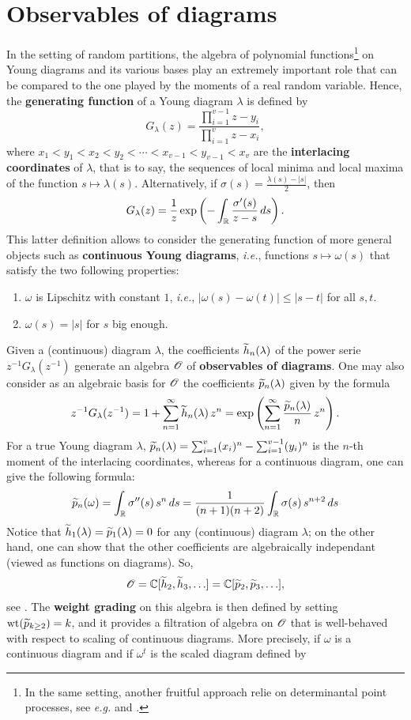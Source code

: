 \documentclass[10pt]{amsart}
\begin{document}
\section{Observables of diagrams}\label{obs}
In the setting of random partitions, the algebra of polynomial functions\footnote{In the same setting, another fruitful approach relie on determinantal point processes, see \emph{e.g.} \cite{BO00} and \cite{BO05}.} on Young diagrams and its various bases play an extremely important role that can be compared to the one played by the moments of a real random variable. Hence, the \textbf{generating function} of a Young diagram $\lambda$ is defined by
$$G_{\lambda}(z)=\frac{\prod_{i=1}^{v-1}z-y_{i}}{\prod_{i=1}^{v}z-x_{i}},$$
where $x_{1}<y_{1}<x_{2}<y_{2}<\cdots<x_{v-1}<y_{v-1}<x_{v}$ are the \textbf{interlacing coordinates} of $\lambda$, that is to say, the sequences of local minima and local maxima of the function $s\mapsto \lambda(s)$. Alternatively, if $\sigma(s)=\frac{\lambda(s)-|s|}{2}$, then 
$$G_{\lambda}(z)=\frac{1}{z}\exp\left(-\int_{\mathbb{R}}\frac{\sigma'(s)}{z-s}\,ds\right).$$
This latter definition allows to consider the generating function of more general objects such as \textbf{continuous Young diagrams}, \emph{i.e.}, functions $s\mapsto \omega(s)$ that satisfy the two following properties:
\begin{enumerate}
\item $\omega$ is Lipschitz with constant $1$, \emph{i.e.}, $|\omega(s)-\omega(t)|\leq |s-t|$ for all $s,t$.
\item $\omega(s)=|s|$ for $s$ big enough.
\end{enumerate}
Given a (continuous) diagram $\lambda$, the coefficients $\widetilde{h}_{n}(\lambda)$ of the power serie $z^{-1}G_{\lambda}(z^{-1})$ generate an algebra $\mathscr{O}$ of \textbf{observables of diagrams}. One may also consider as an algebraic basis for $\mathscr{O}$ the coefficients $\widetilde{p}_{n}(\lambda)$ given by the formula
$$z^{-1}G_{\lambda}(z^{-1})=1+\sum_{n=1}^{\infty} \widetilde{h}_{n}(\lambda)\,z^n=\exp\left(\sum_{n=1}^{\infty} \frac{\widetilde{p}_{n}(\lambda)}{n}\,z^{n}\right).$$
For a true Young diagram $\lambda$, $\widetilde{p}_{n}(\lambda)=\sum_{i=1}^{v}(x_{i})^{n}-\sum_{i=1}^{v-1}(y_{i})^{n}$ is the $n$-th moment of the interlacing coordinates, whereas for a continuous diagram, one can give the following formula:
$$\widetilde{p}_{n}(\omega)=\int_{\mathbb{R}} \sigma''(s)\,s^{n}\,ds=\frac{1}{(n+1)(n+2)}\int_{\mathbb{R}}\sigma(s)\,s^{n+2}\,ds$$
Notice that $\widetilde{h}_{1}(\lambda)=\widetilde{p}_{1}(\lambda)=0$ for any (continuous) diagram $\lambda$; on the other hand, one can show that the other coefficients are algebraically independant (viewed as functions on diagrams). So, $$\mathscr{O}=\mathbb{C}[\widetilde{h}_{2},\widetilde{h}_{3},\ldots]=\mathbb{C}[\widetilde{p}_{2},\widetilde{p}_{3},\ldots],$$ see \cite[\S2]{IO02}. The \textbf{weight grading} on this algebra is then defined by setting $\mathrm{wt}(\widetilde{p}_{k\geq 2})=k$, and it provides a filtration of algebra on $\mathscr{O}$ that is well-behaved with respect to scaling of continuous diagrams. More precisely, if $\omega$ is a continuous diagram and if $\omega^{t}$ is the scaled diagram defined by
\end{document}
